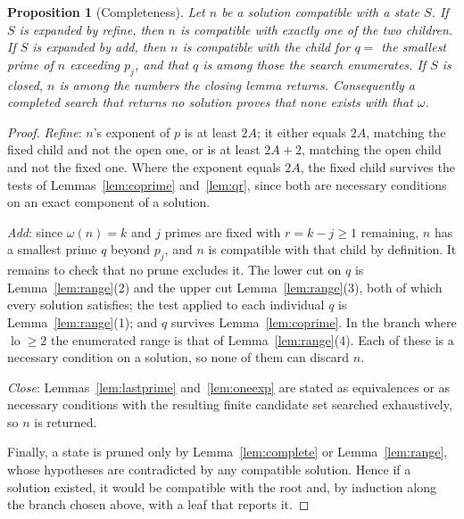 \documentclass[11pt]{amsart}
\newtheorem{proposition}[theorem]{Proposition}
\theoremstyle{remark}
\DeclareMathOperator{\lo}{lo}
\begin{document}
\begin{proposition}[Completeness]\label{prop:complete}
Let $n$ be a solution compatible with a state $S$. If $S$ is expanded by
\emph{refine}, then $n$ is compatible with exactly one of the two children. If
$S$ is expanded by \emph{add}, then $n$ is compatible with the child for
$q = $ the smallest prime of $n$ exceeding $p_j$, and that $q$ is among those
the search enumerates. If $S$ is closed, $n$ is among the numbers the closing
lemma returns. Consequently a completed search that returns no solution proves
that none exists with that $\omega$.
\end{proposition}
\begin{proof}
\emph{Refine}: $n$'s exponent of $p$ is at least $2A$; it either equals $2A$,
matching the fixed child and not the open one, or is at least $2A+2$, matching
the open child and not the fixed one. Where the exponent equals $2A$, the fixed
child survives the tests of Lemmas~\ref{lem:coprime} and~\ref{lem:qr}, since
both are necessary conditions on an exact component of a solution.

\emph{Add}: since $\omega(n) = k$ and $j$ primes are fixed with $r = k - j \ge 1$
remaining, $n$ has a smallest prime $q$ beyond $p_j$, and $n$ is compatible with
that child by definition. It remains to check that no prune excludes it. The
lower cut on $q$ is Lemma~\ref{lem:range}(2) and the upper cut
Lemma~\ref{lem:range}(3), both of which every solution satisfies; the test
applied to each individual $q$ is Lemma~\ref{lem:range}(1); and $q$ survives
Lemma~\ref{lem:coprime}. In the branch where $\lo \ge 2$ the enumerated range is
that of Lemma~\ref{lem:range}(4). Each of these is a necessary condition on a
solution, so none of them can discard $n$.

\emph{Close}: Lemmas~\ref{lem:lastprime} and~\ref{lem:oneexp} are stated as
equivalences or as necessary conditions with the resulting finite candidate set
searched exhaustively, so $n$ is returned.

Finally, a state is pruned only by Lemma~\ref{lem:complete} or
Lemma~\ref{lem:range}, whose hypotheses are contradicted by any compatible
solution. Hence if a solution existed, it would be compatible with the root and,
by induction along the branch chosen above, with a leaf that reports it.
\end{proof}
\end{document}
